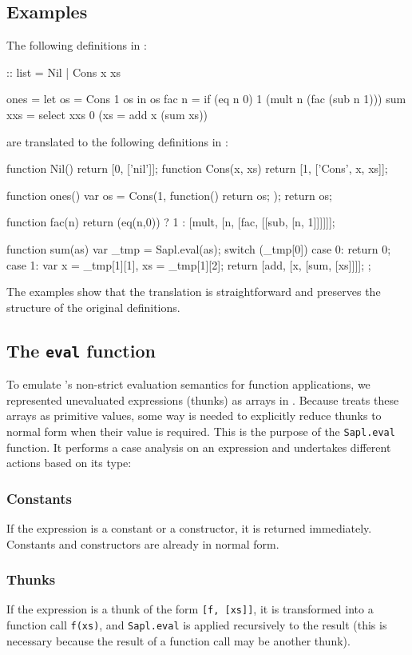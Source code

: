 \subsection{Examples}
The following definitions in \Sapl:
\begin{CleanCode}
:: list = Nil | Cons x xs	

ones = let os = Cons 1 os in os
fac n = if (eq n 0) 1 (mult n (fac (sub n 1)))
sum xxs = select xxs 0 (\x xs = add x (sum xs))
\end{CleanCode}
%
are translated to the following definitions in \JS:
\begin{CleanCode}
function Nil() { return [0, ['nil']]; }
function Cons(x, xs) { return [1, ['Cons', x, xs]]; }

function ones() { var os = Cons(1, function() { return os; }); return os; }

function fac(n) {
    return (eq(n,0)) ? 1 : [mult, [n, [fac, [[sub, [n, 1]]]]]];
}

function sum(as) {
	var _tmp = Sapl.eval(as);
	switch (_tmp[0]) {
		case 0: return 0;
		case 1: var x = _tmp[1][1], xs = _tmp[1][2]; 
				return [add, [x, [sum, [xs]]]];
	};
}

\end{CleanCode}
The examples show that the translation is straightforward and preserves the
structure of the original definitions.

\subsection{The \texttt{eval} function}
\label{eval}
To emulate \Sapl's non-strict evaluation semantics for function applications, 
we represented unevaluated expressions (thunks) as arrays in \JS. Because \JS
treats these arrays as primitive values, some way is needed to explicitly reduce
thunks to normal form when their value is required. This is the purpose of the
\texttt{Sapl.eval} function. It performs a case analysis on an expression and
undertakes different actions based on its type:

\subsubsection{Constants}
If the expression is a constant or a constructor, it is returned immediately. 
Constants and constructors are already in normal form.

\subsubsection{Thunks}
If the expression is a thunk of the form \texttt{[f, [xs]]}, it is transformed 
into a function call \texttt{f(xs)}, and \texttt{Sapl.eval} is applied 
recursively to the result (this is necessary because the result of a function 
call may be another thunk).

